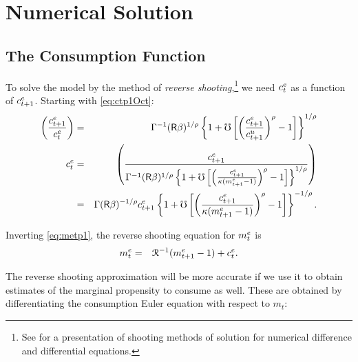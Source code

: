 \documentclass{handout}
\begin{document}
\section{Numerical Solution}

\subsection{The Consumption Function}

To solve the model by the method of {\it reverse shooting},\footnote{See \cite{judd:book} for a presentation of shooting methods of solution for numerical difference and differential equations.} we need $c^{e}_{t}$ as a function
of $c^{e}_{t+1}$.  Starting with \eqref{eq:ctp1Oct}:
\begin{eqnarray}
         \left(\frac{c^{e}_{t+1}}{c^{e}_{t}}\right) & = & \Gamma^{-1} (\mathsf{R}\beta)^{1/\rho} \left\{1+\mho\left[\left(\frac{c^{e}_{t+1}}{c^{u}_{t+1}}\right)^{\rho}-1\right]\right\}^{1/\rho}
\\       c^{e}_{t} & = & \left(\frac{c^{e}_{t+1}}{\Gamma^{-1} (\mathsf{R}\beta)^{1/\rho} \left\{1+\mho\left[\left(\frac{c^{e}_{t+1}}{\kappa (m^{e}_{t+1}-1)}\right)^{\rho}-1\right]\right\}^{1/\rho} }  \right)
\\        & = & \Gamma (\mathsf{R}\beta)^{-1/\rho} c^{e}_{t+1}\left\{1+\mho\left[\left(\frac{c^{e}_{t+1}}{\kappa (m^{e}_{t+1}-1)}\right)^{\rho}-1\right]\right\}^{-1/\rho}        \label{eq:cReverse}.
\end{eqnarray}

Inverting \eqref{eq:metp1}, the reverse shooting equation for $m^{e}_{t}$ is
\begin{eqnarray}
        m^{e}_{t} & = & \mathcal{R}^{-1} (m^{e}_{t+1}-1)+c^{e}_{t} . \label{eq:mReverse}
\end{eqnarray}

The reverse shooting approximation will be more accurate if we use it to obtain estimates
of the marginal propensity to consume as well.  These are obtained 
by differentiating the consumption Euler equation with respect to $m_{t}$:
\end{document}
